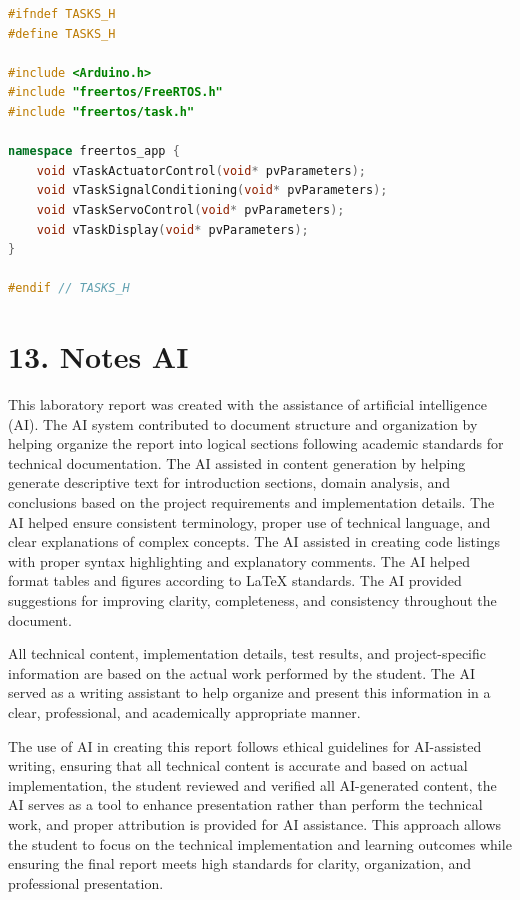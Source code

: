 \documentclass[12pt]{article}
\begin{document}
\begin{lstlisting}[language=C++, caption=tasks.h - Task Interface]
#ifndef TASKS_H
#define TASKS_H

#include <Arduino.h>
#include "freertos/FreeRTOS.h"
#include "freertos/task.h"

namespace freertos_app {
    void vTaskActuatorControl(void* pvParameters);
    void vTaskSignalConditioning(void* pvParameters);
    void vTaskServoControl(void* pvParameters);
    void vTaskDisplay(void* pvParameters);
}

#endif // TASKS_H
\end{lstlisting}

\section*{13. Notes AI}

This laboratory report was created with the assistance of artificial intelligence (AI). The AI system contributed to document structure and organization by helping organize the report into logical sections following academic standards for technical documentation. The AI assisted in content generation by helping generate descriptive text for introduction sections, domain analysis, and conclusions based on the project requirements and implementation details. The AI helped ensure consistent terminology, proper use of technical language, and clear explanations of complex concepts. The AI assisted in creating code listings with proper syntax highlighting and explanatory comments. The AI helped format tables and figures according to LaTeX standards. The AI provided suggestions for improving clarity, completeness, and consistency throughout the document.

All technical content, implementation details, test results, and project-specific information are based on the actual work performed by the student. The AI served as a writing assistant to help organize and present this information in a clear, professional, and academically appropriate manner.

The use of AI in creating this report follows ethical guidelines for AI-assisted writing, ensuring that all technical content is accurate and based on actual implementation, the student reviewed and verified all AI-generated content, the AI serves as a tool to enhance presentation rather than perform the technical work, and proper attribution is provided for AI assistance. This approach allows the student to focus on the technical implementation and learning outcomes while ensuring the final report meets high standards for clarity, organization, and professional presentation.
\end{document}
